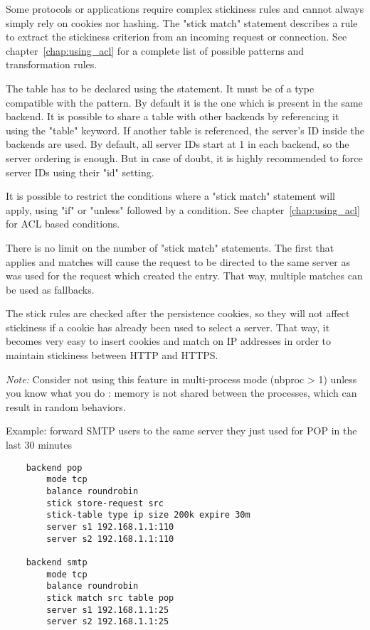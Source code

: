   Some protocols or applications require complex stickiness rules and cannot
  always simply rely on cookies nor hashing. The "stick match" statement
  describes a rule to extract the stickiness criterion from an incoming request
  or connection. See chapter~\ref{chap:using_acl} for a complete list of possible patterns and
  transformation rules.

  The table has to be declared using the  statement. It must be of
  a type compatible with the pattern. By default it is the one which is present
  in the same backend. It is possible to share a table with other backends by
  referencing it using the "table" keyword. If another table is referenced,
  the server's ID inside the backends are used. By default, all server IDs
  start at 1 in each backend, so the server ordering is enough. But in case of
  doubt, it is highly recommended to force server IDs using their "id" setting.

  It is possible to restrict the conditions where a "stick match" statement
  will apply, using "if" or "unless" followed by a condition. See chapter~\ref{chap:using_acl} for
  ACL based conditions.

  There is no limit on the number of "stick match" statements. The first that
  applies and matches will cause the request to be directed to the same server
  as was used for the request which created the entry. That way, multiple
  matches can be used as fallbacks.

  The stick rules are checked after the persistence cookies, so they will not
  affect stickiness if a cookie has already been used to select a server. That
  way, it becomes very easy to insert cookies and match on IP addresses in
  order to maintain stickiness between HTTP and HTTPS.

  \emph{Note:} Consider not using this feature in multi-process mode (nbproc > 1)
         unless you know what you do : memory is not shared between the
         processes, which can result in random behaviors.

  Example: forward SMTP users to the same server they just used for POP in the last 30 minutes
  \begin{verbatim}
    backend pop
        mode tcp
        balance roundrobin
        stick store-request src
        stick-table type ip size 200k expire 30m
        server s1 192.168.1.1:110
        server s2 192.168.1.1:110

    backend smtp
        mode tcp
        balance roundrobin
        stick match src table pop
        server s1 192.168.1.1:25
        server s2 192.168.1.1:25
  \end{verbatim}



